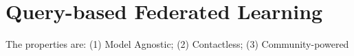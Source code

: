 \section{Query-based Federated Learning}

The properties are: (1) Model Agnostic; (2) Contactless; (3) Community-powered